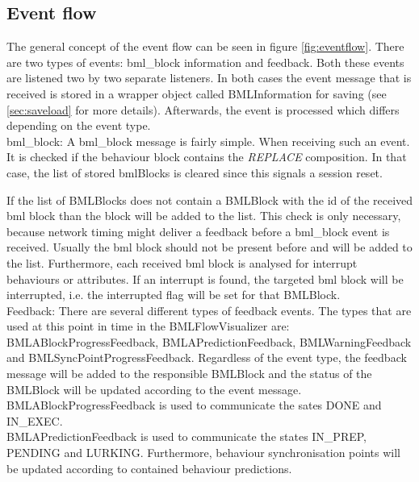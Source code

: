 \documentclass[12pt,a4paper]{article}
\begin{document}
\subsection{Event flow} \label{sec:eventflow}

The general concept of the event flow can be seen in figure \ref{fig:eventflow}.
There are two types of events: bml\_block information and feedback. Both these events are listened two by two separate listeners. In both cases the event message that is received is stored in a wrapper object called BMLInformation for saving (see \ref{sec:saveload} for more details). Afterwards, the event is processed which differs depending on the event type. \\

bml\_block: A bml\_block message is fairly simple. When receiving such an event. It is checked if the behaviour block contains the \textit{REPLACE} composition. In that case, the list of stored bmlBlocks is cleared since this signals a session reset.

If the list of BMLBlocks does not contain a BMLBlock with the id of the received bml block than the block will be added to the list. This check is only necessary, because network timing might deliver a feedback before a bml\_block event is received. Usually the bml block should not be present before and will be added to the list. Furthermore, each received bml block is analysed for interrupt behaviours or attributes. If an interrupt is found, the targeted bml block will be interrupted, i.e. the interrupted flag will be set for that BMLBlock. \\

Feedback: There are several different types of feedback events. The types that are used at this point in time in the BMLFlowVisualizer are: BMLABlockProgressFeedback, BMLAPredictionFeedback, BMLWarningFeedback and BMLSyncPointProgressFeedback.
Regardless of the event type, the feedback message will be added to the responsible BMLBlock and the status of the BMLBlock will be updated according to the event message. \\

BMLABlockProgressFeedback is used to communicate the sates DONE and IN\_EXEC. \\

BMLAPredictionFeedback is used to communicate the states IN\_PREP, PENDING and LURKING. Furthermore, behaviour synchronisation points will be updated according to contained behaviour predictions. \\
\end{document}
